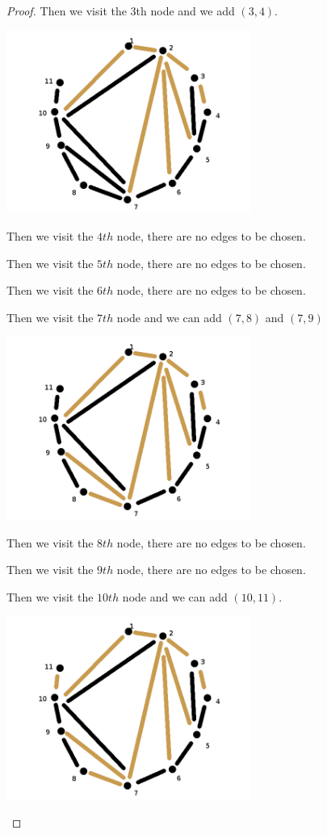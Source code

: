 \begin{proof}
    Then we visit the 3th node and we add $(3, 4)$.
    \begin{center}
        \includegraphics[width=8cm]{Homework1/Problem4/TriangulationToPlanarRootedTree5.png}
    \end{center}
    
    Then we visit the $4th$ node, there are no edges to be chosen.\pn
    
    Then we visit the $5th$ node, there are no edges to be chosen.\pn
    
    Then we visit the $6th$ node, there are no edges to be chosen.\pn
    
    Then we visit the $7th$ node and we can add $(7, 8)$ and $(7, 9)$
    \begin{center}
        \includegraphics[width=8cm]{Homework1/Problem4/TriangulationToPlanarRootedTree6.png}
    \end{center}
    
    Then we visit the $8th$ node, there are no edges to be chosen.\pn
    
    Then we visit the $9th$ node, there are no edges to be chosen.\pn
    
    Then we visit the $10th$ node and we can add $(10, 11)$.\pn
    \begin{center}
        \includegraphics[width=8cm]{Homework1/Problem4/TriangulationToPlanarRootedTree7.png}
    \end{center}
    

\end{proof}
